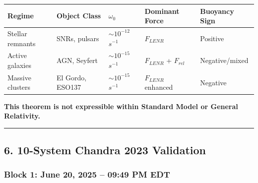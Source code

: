 \documentclass[
  11pt,
]{article}
\newcounter{none} %
\begin{document}
{\def\LTcaptype{none} %
\begin{longtable}[]{@{}
  >{\raggedright\arraybackslash}p{}
  >{\raggedright\arraybackslash}p{}
  >{\raggedright\arraybackslash}p{}
  >{\raggedright\arraybackslash}p{}
  >{\raggedright\arraybackslash}p{}@{}}
\toprule\noalign{}
\begin{minipage}[b]{\linewidth}\raggedright
Regime
\end{minipage} & \begin{minipage}[b]{\linewidth}\raggedright
Object Class
\end{minipage} & \begin{minipage}[b]{\linewidth}\raggedright
\(\omega_0\)
\end{minipage} & \begin{minipage}[b]{\linewidth}\raggedright
Dominant Force
\end{minipage} & \begin{minipage}[b]{\linewidth}\raggedright
Buoyancy Sign
\end{minipage} \\
\midrule\noalign{}
\endhead
\bottomrule\noalign{}
\endlastfoot
Stellar remnants & SNRs, pulsars & \(\sim 10^{-12}\) \(s^{-1}\) &
\(F_{LENR}\) & Positive \\
Active galaxies & AGN, Seyfert & \(\sim 10^{-15}\) \(s^{-1}\) &
\(F_{LENR}\) + \(F_{rel}\) & Negative/mixed \\
Massive clusters & El Gordo, ESO137 & \(\sim 10^{-15}\) \(s^{-1}\) &
\(F_{LENR}\) enhanced & Negative \\
\end{longtable}
}

\textbf{This theorem is not expressible within Standard Model or General
Relativity.}

\begin{center}\rule{0.5\linewidth}{0.5pt}\end{center}

\subsection{6. 10-System Chandra 2023
Validation}\label{system-chandra-2023-validation}

\subsubsection{Block 1: June 20, 2025 -- 09:49 PM
EDT}\label{block-1-june-20-2025-0949-pm-edt}
\end{document}
